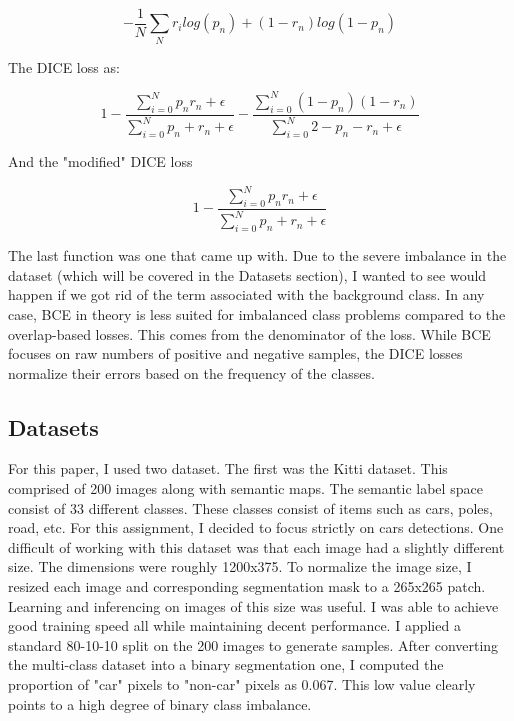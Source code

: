\documentclass[Location Location Location! : Exploring Image Segmentation Problem In Urban Driving Scenarios]{IEEEtran}
\begin{document}
\begin{equation}
-\frac{1}{N} \sum_N r_ilog(p_n) + (1 - r_n)log(1 -p_n)
\end{equation}

The DICE loss as:

\begin{equation}
1 -\frac{\sum_{i=0}^N p_nr_n + \epsilon}{\sum_{i=0}^N  p_n + r_n + \epsilon} - \frac{\sum_{i=0}^N  (1 - p_n)(1 - r_n)}{\sum_{i=0}^N  2 - p_n - r_n +\epsilon}
\end{equation}

And the "modified" DICE loss

\begin{equation}
1 -\frac{\sum_{i=0}^N p_nr_n + \epsilon}{\sum_{i=0}^N  p_n + r_n + \epsilon} 
\end{equation}

The last function was one that came up with. Due to the severe imbalance in the dataset (which will be covered in the Datasets section), I wanted to see would happen if we got rid of the term associated with the background class. In any case, BCE in theory is less suited for imbalanced class problems compared to the overlap-based losses. This comes from the denominator of the loss. While BCE focuses on raw numbers of positive and negative samples, the DICE losses normalize their errors based on the frequency of the classes.  	

\subsection{Datasets}

For this paper, I used two dataset. The first was the Kitti \cite{kitti} dataset. This comprised of 200 images along with semantic maps. The semantic label space consist of 33 different classes. These classes consist of items such as cars, poles, road, etc. For this assignment, I decided to focus strictly on cars detections. One difficult of working with this dataset was that each image had a slightly different size. The dimensions were roughly 1200x375. To normalize the image size, I resized each image and corresponding segmentation mask to a 265x265 patch. Learning and inferencing on images of this size was useful. I was able to achieve good training speed all while maintaining decent performance. I applied a standard 80-10-10 split on the 200 images to generate samples. After converting the multi-class dataset into a binary segmentation one, I computed the proportion of "car" pixels to "non-car" pixels as 0.067. This low value clearly points to a high degree of binary class imbalance. 
\end{document}
